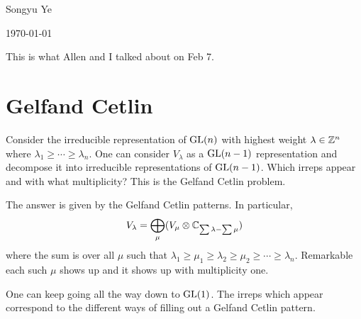 \documentclass[12pt]{article}
\begin{document}
Songyu Ye

\today

This is what Allen and I talked about on Feb 7.

\section{Gelfand Cetlin}
Consider the irreducible representation of $\operatorname{GL}(n)$ with highest weight $\lambda \in \mathbb{Z}^n$ where 
$\lambda_1\geq \cdots \geq \lambda_n$. One can consider $V_\lambda$ as a $\operatorname{GL}(n-1)$ representation
and decompose it into irreducible representations of $\operatorname{GL}(n-1)$. Which irreps appear and with what
multiplicity? This is the Gelfand Cetlin problem.

\hfill

The answer is given by the Gelfand Cetlin patterns. In particular, \begin{align*}
    V_\lambda = \bigoplus_{\mu} (V_\mu \otimes \mathbb{C}_{\sum\lambda - \sum\mu})
\end{align*} where the sum is over all $\mu$ such that $\lambda_1\geq \mu_1\geq \lambda_2\geq \mu_2\geq \cdots \geq \lambda_n$.
Remarkable each such $\mu$ shows up and it shows up with multiplicity one.

One can keep going all the way down to $\operatorname{GL}(1)$. The irreps which appear correspond to the 
different ways of filling out a Gelfand Cetlin pattern.
\end{document}
